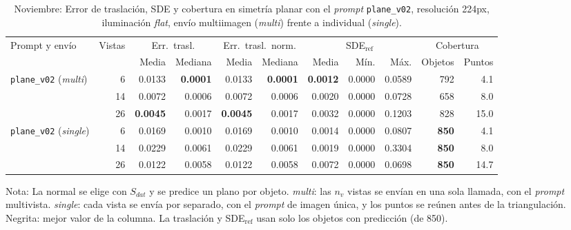\begin{table}[htbp]
\centering
\caption{Noviembre: Error de traslación, SDE y cobertura en simetría planar con el \textit{prompt} \texttt{plane\_v02}, resolución 224px, iluminación \textit{flat}, envío multiimagen (\textit{multi}) frente a individual (\textit{single}).}
\label{tab:nov_plane_v02_modo_envio_posicion}
\begin{lrbox}{\tablebox}
\begin{adjustbox}{max width=\textwidth}
\begin{tabular}{lrrrrrrrrrr}
\toprule
\multirow{2}{*}{Prompt y envío} & \multirow{2}{*}{Vistas} & \multicolumn{2}{c}{Err.\ trasl.} & \multicolumn{2}{c}{Err.\ trasl.\ norm.} & \multicolumn{3}{c}{SDE$_{\mathrm{ref}}$} & \multicolumn{2}{c}{Cobertura} \\
\cmidrule(lr){3-4} \cmidrule(lr){5-6} \cmidrule(lr){7-9} \cmidrule(lr){10-11}
 &  & Media & Mediana & Media & Mediana & Media & Mín. & Máx. & Objetos & Puntos \\
\midrule
\multirow{3}{*}{\texttt{plane\_v02} (\textit{multi})} & 6 & 0.0133 & \textbf{0.0001} & 0.0133 & \textbf{0.0001} & \textbf{0.0012} & 0.0000 & 0.0589 & 792 & 4.1 \\
 & 14 & 0.0072 & 0.0006 & 0.0072 & 0.0006 & 0.0020 & 0.0000 & 0.0728 & 658 & 8.0 \\
 & 26 & \textbf{0.0045} & 0.0017 & \textbf{0.0045} & 0.0017 & 0.0032 & 0.0000 & 0.1203 & 828 & 15.0 \\
\midrule
\multirow{3}{*}{\texttt{plane\_v02} (\textit{single})} & 6 & 0.0169 & 0.0010 & 0.0169 & 0.0010 & 0.0014 & 0.0000 & 0.0807 & \textbf{850} & 4.1 \\
 & 14 & 0.0229 & 0.0061 & 0.0229 & 0.0061 & 0.0019 & 0.0000 & 0.3304 & \textbf{850} & 8.0 \\
 & 26 & 0.0122 & 0.0058 & 0.0122 & 0.0058 & 0.0072 & 0.0000 & 0.0698 & \textbf{850} & 14.7 \\
\bottomrule
\end{tabular}
\end{adjustbox}
\end{lrbox}
\usebox{\tablebox}

\vspace{1.5ex}
\begin{minipage}{\wd\tablebox}
\footnotesize
Nota: La normal se elige con $S_{dat}$ y se predice un plano por objeto. \textit{multi}: las $n_v$ vistas se envían en una sola llamada, con el \textit{prompt} multivista. \textit{single}: cada vista se envía por separado, con el \textit{prompt} de imagen única, y los puntos se reúnen antes de la triangulación. Negrita: mejor valor de la columna. La traslación y SDE$_{\mathrm{ref}}$ usan solo los objetos con predicción (de 850).
\end{minipage}
\end{table}

